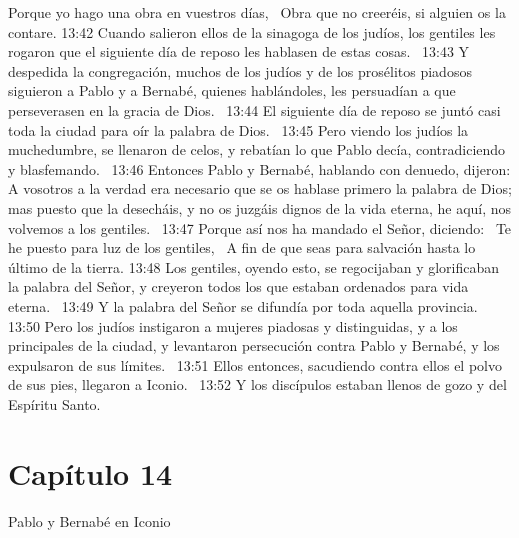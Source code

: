 Porque yo hago una obra en vuestros días,  
Obra que no creeréis, si alguien os la contare. 
13:42 Cuando salieron ellos de la sinagoga de los judíos, los gentiles les rogaron que el siguiente día de reposo les hablasen de estas cosas.  
13:43 Y despedida la congregación, muchos de los judíos y de los prosélitos piadosos siguieron a Pablo y a Bernabé, quienes hablándoles, les persuadían a que perseverasen en la gracia de Dios.  
13:44 El siguiente día de reposo se juntó casi toda la ciudad para oír la palabra de Dios.  
13:45 Pero viendo los judíos la muchedumbre, se llenaron de celos, y rebatían lo que Pablo decía, contradiciendo y blasfemando.  
13:46 Entonces Pablo y Bernabé, hablando con denuedo, dijeron: A vosotros a la verdad era necesario que se os hablase primero la palabra de Dios; mas puesto que la desecháis, y no os juzgáis dignos de la vida eterna, he aquí, nos volvemos a los gentiles.  
13:47 Porque así nos ha mandado el Señor, diciendo:  
Te he puesto para luz de los gentiles,  
A fin de que seas para salvación hasta lo último de la tierra. 
13:48 Los gentiles, oyendo esto, se regocijaban y glorificaban la palabra del Señor, y creyeron todos los que estaban ordenados para vida eterna.  
13:49 Y la palabra del Señor se difundía por toda aquella provincia.  
13:50 Pero los judíos instigaron a mujeres piadosas y distinguidas, y a los principales de la ciudad, y levantaron persecución contra Pablo y Bernabé, y los expulsaron de sus límites.  
13:51 Ellos entonces, sacudiendo contra ellos el polvo de sus pies, llegaron a Iconio.  
13:52 Y los discípulos estaban llenos de gozo y del Espíritu Santo.  
\section*{Capítulo 14}
Pablo y Bernabé en Iconio  

